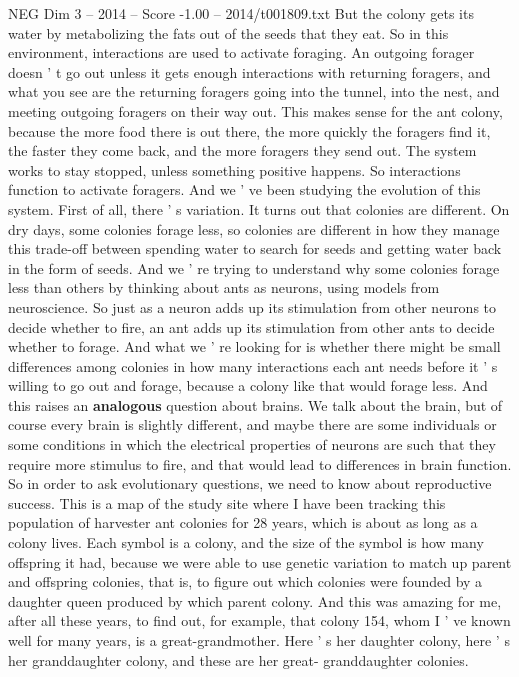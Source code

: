 \begin{textsample}{NEG Dim 3 – 2014 – Score -1.00 – 2014/t001809.txt}
But the colony gets its water by metabolizing the fats out of the seeds that they eat.
So in this environment, interactions are used to activate foraging.
An outgoing forager doesn ' t go out unless it gets enough interactions with returning foragers, and what you see are the returning foragers going into the tunnel, into the nest, and meeting outgoing foragers on their way out.
This makes sense for the ant colony, because the more food there is out there, the more quickly the foragers find it, the faster they come back, and the more foragers they send out.
The system works to stay stopped, unless something positive happens.
So interactions function to activate foragers.
And we ' ve been studying the evolution of this system.
First of all, there ' s variation.
It turns out that colonies are different.
On dry days, some colonies forage less, so colonies are different in how they manage this trade-off between spending water to search for seeds and getting water back in the form of seeds.
And we ' re trying to understand why some colonies forage less than others by thinking about ants as neurons, using models from neuroscience.
So just as a neuron adds up its stimulation from other neurons to decide whether to fire, an ant adds up its stimulation from other ants to decide whether to forage.
And what we ' re looking for is whether there might be small differences among colonies in how many interactions each ant needs before it ' s willing to go out and forage, because a colony like that would forage less.
And this raises an \textbf{analogous} question about brains.
We talk about the brain, but of course every brain is slightly different, and maybe there are some individuals or some conditions in which the electrical properties of neurons are such that they require more stimulus to fire, and that would lead to differences in brain function.
So in order to ask evolutionary questions, we need to know about reproductive success.
This is a map of the study site where I have been tracking this population of harvester ant colonies for 28 years, which is about as long as a colony lives.
Each symbol is a colony, and the size of the symbol is how many offspring it had, because we were able to use genetic variation to match up parent and offspring colonies, that is, to figure out which colonies were founded by a daughter queen produced by which parent colony.
And this was amazing for me, after all these years, to find out, for example, that colony 154, whom I ' ve known well for many years, is a great-grandmother.
Here ' s her daughter colony, here ' s her granddaughter colony, and these are her great- granddaughter colonies.

\end{textsample}
